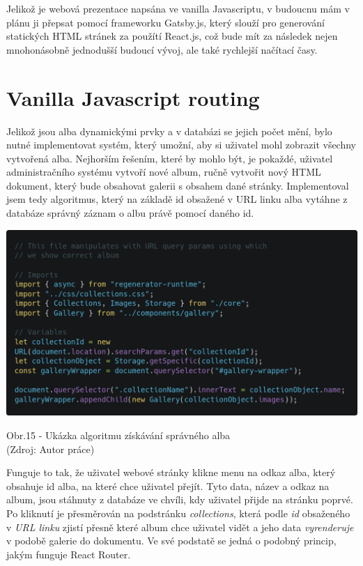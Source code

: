 \documentclass[12pt,a4paper]{report}
\begin{document}
  Jelikož je webová prezentace napsána ve vanilla Javascriptu, v budoucnu mám v plánu ji přepsat
  pomocí frameworku Gatsby.js, který slouží pro generování statických HTML stránek za použítí
  React.js, což bude mít za následek nejen mnohonásobně jednodušší budoucí vývoj, ale také
  rychlejší načítací časy.

  \section{Vanilla Javascript routing}
  Jelikož jsou alba dynamickými prvky a v databázi se jejich počet mění, bylo nutné implementovat systém, který
  umožní, aby si uživatel mohl zobrazit všechny vytvořená alba. Nejhorším řešením, které by mohlo být,
  je pokaždé, uživatel administračního systému vytvoří nové album, ručně vytvořit nový HTML dokument, který bude 
  obsahovat galerii s obsahem dané stránky. Implementoval jsem tedy algoritmus, který na základě id obsažené v URL linku alba vytáhne z
  databáze správný záznam o albu právě pomocí daného id.

  \vspace*{0.5cm}
  \noindent\includegraphics[width=\linewidth]{vanillaJsRoutingCodeblock.png}
  \begin{center}
    Obr.15 -   Ukázka algoritmu získávání správného alba \\
    (Zdroj: Autor práce)
  \end{center}
  \vspace*{0.5cm}

  Funguje to tak, že uživatel webové stránky klikne menu na odkaz alba, který obsahuje id alba, na které chce uživatel přejít.
  Tyto data, název a odkaz na album, jsou stáhnuty z databáze ve chvíli, kdy uživatel přijde na stránku poprvé.
  Po kliknutí je přesměrován na podstránku \emph{collections}, která podle \emph{id} obsaženého v \emph{URL linku}
  zjistí přesně které album chce uživatel vidět a jeho data \emph{vyrenderuje} v podobě galerie do dokumentu.
  Ve své podstatě se jedná o podobný princip, jakým funguje React Router.
\end{document}
